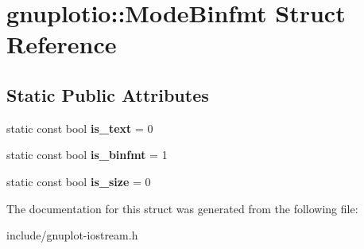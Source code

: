 \hypertarget{structgnuplotio_1_1ModeBinfmt}{}\section{gnuplotio\+:\+:Mode\+Binfmt Struct Reference}
\label{structgnuplotio_1_1ModeBinfmt}
\subsection*{Static Public Attributes}
\begin{DoxyCompactItemize}
\item 
\mbox{\label{structgnuplotio_1_1ModeBinfmt_a7ab187fe922cac23b0d39ade81e5eb56}} 
static const bool {\bfseries is\+\_\+text} = 0
\item 
\mbox{\label{structgnuplotio_1_1ModeBinfmt_ab0d5d3718364cdea0347f93ec121d841}} 
static const bool {\bfseries is\+\_\+binfmt} = 1
\item 
\mbox{\label{structgnuplotio_1_1ModeBinfmt_a40a5a8ee815d6a5e9a3c30c8290a6967}} 
static const bool {\bfseries is\+\_\+size} = 0
\end{DoxyCompactItemize}


The documentation for this struct was generated from the following file\+:\begin{DoxyCompactItemize}
\item 
include/gnuplot-\/iostream.\+h\end{DoxyCompactItemize}
